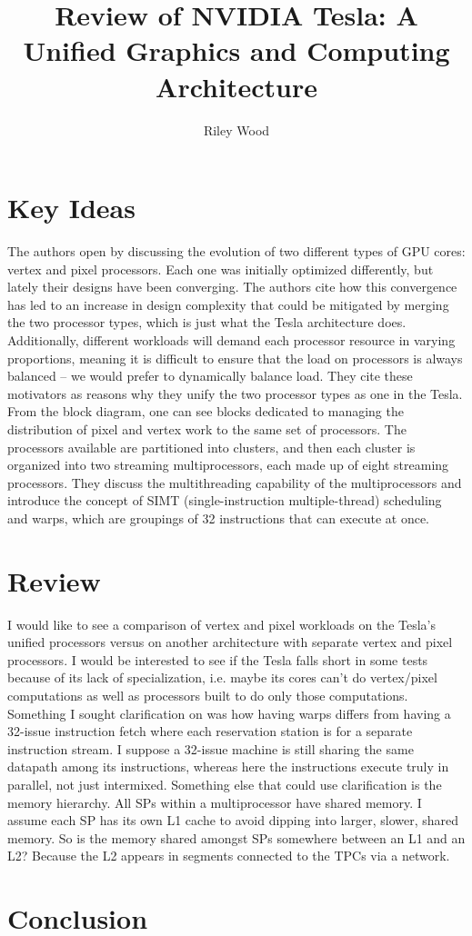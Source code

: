 \documentclass{article}
\title{Review of NVIDIA Tesla: A Unified Graphics and Computing Architecture \cite{Tesla}}
\author{Riley Wood}
\begin{document}
\maketitle


\section*{Key Ideas}
The authors open by discussing the evolution of two different types of GPU cores: vertex and pixel processors. Each one was initially optimized differently, but lately their designs have been converging. The authors cite how this convergence has led to an increase in design complexity that could be mitigated by merging the two processor types, which is just what the Tesla architecture does. Additionally, different workloads will demand each processor resource in varying proportions,
meaning it is difficult to ensure that the load on processors is always balanced -- we would prefer to dynamically balance load. They cite these motivators as reasons why they unify the two processor types as one in the Tesla. From the block diagram, one can see blocks dedicated to managing the distribution of pixel and vertex work to the same set of processors. The processors available are partitioned into clusters, and then each cluster is organized into two streaming multiprocessors,
each made up of eight streaming processors. They discuss the multithreading capability of the multiprocessors and introduce the concept of SIMT (single-instruction multiple-thread) scheduling and warps, which are groupings of 32 instructions that can execute at once.

\section*{Review}
I would like to see a comparison of vertex and pixel workloads on the Tesla's unified processors versus on another architecture with separate vertex and pixel processors. I would be interested to see if the Tesla falls short in some tests because of its lack of specialization, i.e. maybe its cores can't do vertex/pixel computations as well as processors built to do only those computations. Something I sought clarification on was how having warps differs from having a 32-issue instruction
fetch where each reservation station is for a separate instruction stream. I suppose a 32-issue machine is still sharing the same datapath among its instructions, whereas here the instructions execute truly in parallel, not just intermixed. Something else that could use clarification is the memory hierarchy. All SPs within a multiprocessor have shared memory. I assume each SP has its own L1 cache to avoid dipping into larger, slower, shared memory. So is the memory shared amongst SPs
somewhere between an L1 and an L2? Because the L2 appears in segments connected to the TPCs via a network.

\section*{Conclusion}





\end{document}
